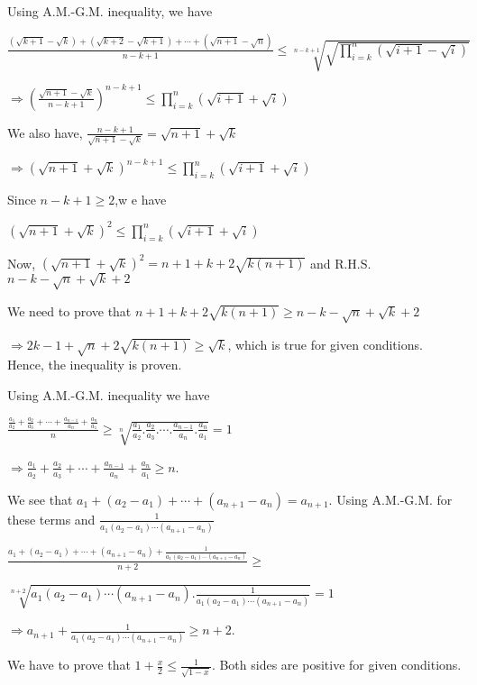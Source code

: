  Using A.M.-G.M. inequality, we have

  $\displaystyle\frac{(\sqrt{k + 1} - \sqrt{k}) + (\sqrt{k + 2} - \sqrt{k + 1}) + \cdots + (\sqrt{n + 1} -
    \sqrt{n})}{n - k + 1}\leq \sqrt[n - k + 1]{\sqrt{\prod_{i = k}^n(\sqrt{i + 1} - \sqrt{i})}}$

  $\Rightarrow \displaystyle\left(\frac{\sqrt{n + 1} - \sqrt{k}}{n - k + 1}\right)^{n - k + 1} \leq \prod_{i
    = k}^n(\sqrt{i + 1} + \sqrt{i})$

  We also have, $\displaystyle\frac{n - k + 1}{\sqrt{n + 1} - \sqrt{k}} = \sqrt{n + 1} + \sqrt{k}$

  $\Rightarrow (\sqrt{n + 1} + \sqrt{k})^{n - k + 1}\leq \prod_{i = k}^n(\sqrt{i + 1} + \sqrt{i})$

  Since $n - k + 1\geq 2$,w e have

  $\displaystyle(\sqrt{n + 1} + \sqrt{k})^2\leq \prod_{i = k}^n(\sqrt{i + 1} + \sqrt{i})$

  Now, $(\sqrt{n + 1} + \sqrt{k})^2 = n + 1 + k + 2\sqrt{k(n + 1)}$ and R.H.S.\ $n - k - \sqrt{n} + \sqrt{k}
  + 2$

  We need to prove that $n + 1 + k + 2\sqrt{k(n + 1)}\geq n - k -\sqrt{n} + \sqrt{k} + 2$

  $\Rightarrow 2k - 1 + \sqrt{n} + 2\sqrt{k(n + 1)}\geq \sqrt{k}$, which is true for given
  conditions. Hence, the inequality is proven.
\item Using A.M.-G.M. inequality we have

  $\displaystyle\frac{\frac{a_1}{a_2} + \frac{a_2}{a_3} + \cdots + \frac{a_{n - 1}}{a_n} +
  \frac{a_n}{a_1}}{n}\geq \sqrt[n]{\frac{a_1}{a_2}.\frac{a_2}{a_3}.\cdots.\frac{a_{n - 1}}{a_n}.
  \frac{a_n}{a_1}} = 1$

  $\Rightarrow \frac{a_1}{a_2} + \frac{a_2}{a_3} + \cdots + \frac{a_{n - 1}}{a_n} + \frac{a_n}{a_1}\geq n$.
\item We see that $a_1 + (a_2 - a_1) + \cdots + (a_{n + 1} - a_n) = a_{n + 1}$. Using A.M.-G.M. for these
  terms and $\frac{1}{a_1(a_2 - a_1)\cdots(a_{n + 1} - a_n)}$

  $\displaystyle\frac{a_1 + (a_2 - a_1) + \cdots + (a_{n + 1} - a_n) + \frac{1}{a_1(a_2 - a_1)\cdots
      (a_{n + 1} - a_n)}}{n + 2}\geq$

  $\displaystyle\sqrt[n + 2]{a_1(a_2 - a_1)\cdots(a_{n + 1} - a_n).\frac{1}{a_1(a_2 -
      a_1)\cdots(a_{n + 1} - a_n)}} = 1$

  $\Rightarrow \displaystyle a_{n + 1} + \frac{1}{a_1(a_2 - a_1)\cdots (a_{n + 1} - a_n)}\geq n + 2$.
\item We have to prove that $1 + \frac{x}{2}\leq \frac{1}{\sqrt{1 - x}}$. Both sides are positive for given
  conditions.

